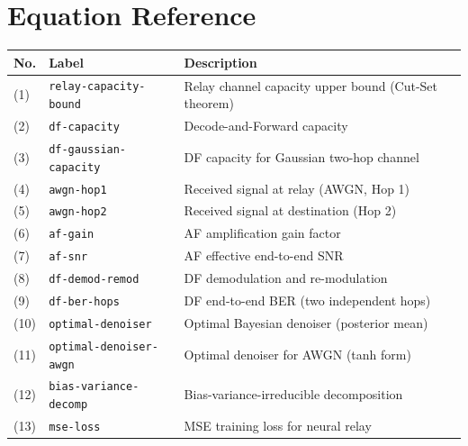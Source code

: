 \chapter*{Equation Reference}\label{sec:equation-reference}

{\def\LTcaptype{table} %
\begin{longtable}[]{@{}
  >{\raggedright\arraybackslash}p{}
  >{\raggedright\arraybackslash}p{}
  >{\raggedright\arraybackslash}p{}@{}}
\toprule\noalign{}
\begin{minipage}[b]{\linewidth}\raggedright
No.
\end{minipage} & \begin{minipage}[b]{\linewidth}\raggedright
Label
\end{minipage} & \begin{minipage}[b]{\linewidth}\raggedright
Description
\end{minipage} \\
\midrule\noalign{}
\endhead
\bottomrule\noalign{}
\endlastfoot
(1) & \texttt{relay-capacity-bound} & Relay channel capacity upper bound (Cut-Set theorem) \\
(2) & \texttt{df-capacity} & Decode-and-Forward capacity \\
(3) & \texttt{df-gaussian-capacity} & DF capacity for Gaussian two-hop channel \\
(4) & \texttt{awgn-hop1} & Received signal at relay (AWGN, Hop 1) \\
(5) & \texttt{awgn-hop2} & Received signal at destination (Hop 2) \\
(6) & \texttt{af-gain} & AF amplification gain factor \\
(7) & \texttt{af-snr} & AF effective end-to-end SNR \\
(8) & \texttt{df-demod-remod} & DF demodulation and re-modulation \\
(9) & \texttt{df-ber-hops} & DF end-to-end BER (two independent hops) \\
(10) & \texttt{optimal-denoiser} & Optimal Bayesian denoiser (posterior mean) \\
(11) & \texttt{optimal-denoiser-awgn} & Optimal denoiser for AWGN (tanh form) \\
(12) & \texttt{bias-variance-decomp} & Bias-variance-irreducible decomposition \\
(13) & \texttt{mse-loss} & MSE training loss for neural relay \\

\end{longtable}}
